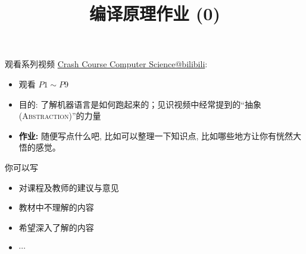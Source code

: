 \documentclass[a4paper, justified]{tufte-handout}
\title{编译原理作业 (0)}
\date{\zhtoday}
\begin{document}
\maketitle
\noplagiarism %
\begin{abstract}
\end{abstract}
\beginrequired
\begin{problem}[计算机系统基础]
  观看系列视频 \href{https://www.bilibili.com/video/BV1EW411u7th?}{Crash Course Computer Science@bilibili}:
  \begin{itemize}
    \item 观看 $P1 \sim P9$
    \item 目的: 了解机器语言是如何跑起来的；见识视频中经常提到的``抽象(\textsc{Abstraction})''的力量
    \item {\bf 作业:} 随便写点什么吧, 比如可以整理一下知识点, 比如哪些地方让你有恍然大悟的感觉。
  \end{itemize}
\end{problem}

\begin{solution}
\end{solution}



\beginfb

你可以写
\begin{itemize}
  \item 对课程及教师的建议与意见
  \item 教材中不理解的内容
  \item 希望深入了解的内容
  \item $\cdots$
\end{itemize}
\end{document}
